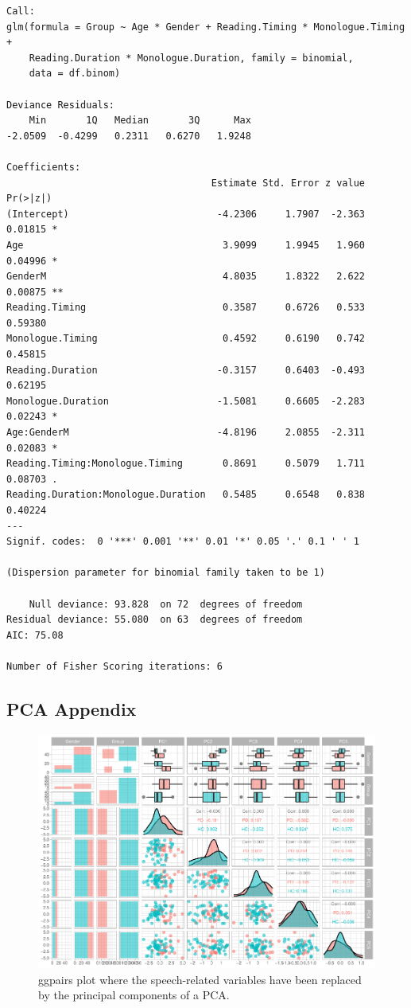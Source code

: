 \documentclass[
  english,
  doc,floatsintext]{apa6}
\begin{document}
\begin{verbatim}
Call:
glm(formula = Group ~ Age * Gender + Reading.Timing * Monologue.Timing + 
    Reading.Duration * Monologue.Duration, family = binomial, 
    data = df.binom)

Deviance Residuals: 
    Min       1Q   Median       3Q      Max  
-2.0509  -0.4299   0.2311   0.6270   1.9248  

Coefficients:
                                    Estimate Std. Error z value Pr(>|z|)   
(Intercept)                          -4.2306     1.7907  -2.363  0.01815 * 
Age                                   3.9099     1.9945   1.960  0.04996 * 
GenderM                               4.8035     1.8322   2.622  0.00875 **
Reading.Timing                        0.3587     0.6726   0.533  0.59380   
Monologue.Timing                      0.4592     0.6190   0.742  0.45815   
Reading.Duration                     -0.3157     0.6403  -0.493  0.62195   
Monologue.Duration                   -1.5081     0.6605  -2.283  0.02243 * 
Age:GenderM                          -4.8196     2.0855  -2.311  0.02083 * 
Reading.Timing:Monologue.Timing       0.8691     0.5079   1.711  0.08703 . 
Reading.Duration:Monologue.Duration   0.5485     0.6548   0.838  0.40224   
---
Signif. codes:  0 '***' 0.001 '**' 0.01 '*' 0.05 '.' 0.1 ' ' 1

(Dispersion parameter for binomial family taken to be 1)

    Null deviance: 93.828  on 72  degrees of freedom
Residual deviance: 55.080  on 63  degrees of freedom
AIC: 75.08

Number of Fisher Scoring iterations: 6
\end{verbatim}

\hypertarget{pca-appendix}{%
\subsection{PCA Appendix}\label{pca-appendix}}

\begin{figure}
\centering
\includegraphics{dap_report_anja_probst_files/figure-latex/pca-ggpairs-1.pdf}
\caption{\label{fig:pca-ggpairs}ggpairs plot where the speech-related variables have been replaced by the principal components of a PCA.}
\end{figure}
\end{document}
